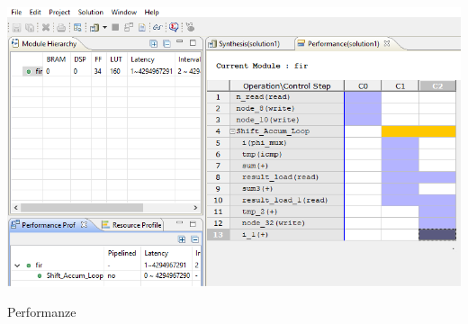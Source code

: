 \begin{minipage}{\textwidth}
    \begin{center}        
        \includegraphics[scale=0.75]{img/Fibo.png} 
    \end{center}
\end{minipage}
\begin{center}
Performanze
\end{center}





